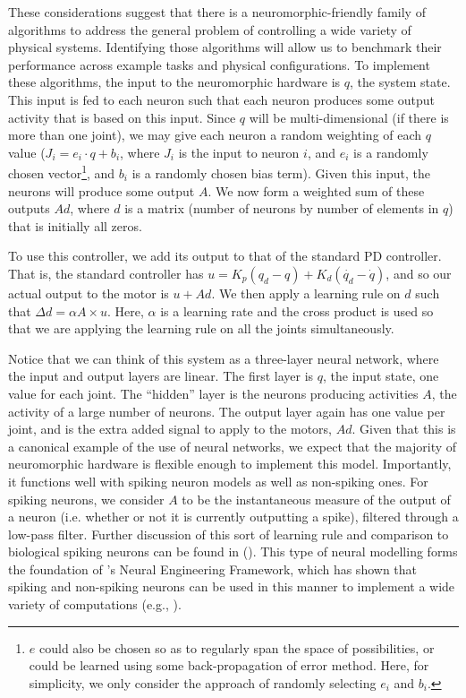 \documentclass{frontiersSCNS} %
\begin{document}
These considerations suggest that there is a neuromorphic-friendly family of 
algorithms to address the general problem of controlling a wide variety of 
physical systems.  Identifying those algorithms will allow us to benchmark 
their performance across example tasks and physical configurations.  
To implement these algorithms, the input to the
neuromorphic hardware is $q$, the system state.  This input is fed to each
neuron such that each neuron produces some output activity that is based on
this input.  Since $q$ will be multi-dimensional (if there is more than one
joint), we may give each neuron a random weighting of each $q$ value ($J_i=e_i \cdot q + b_i$, 
where $J_i$ is the input to neuron $i$, and $e_i$ is a randomly chosen 
vector\footnote{$e$ could also be chosen so as to regularly span the space of possibilities,
or could be learned using some back-propagation of error method.  Here, for simplicity, we only
consider the approach of randomly selecting $e_i$ and $b_i$.},
and $b_i$ is a randomly chosen bias term).  
Given this input, the neurons will produce some output $A$.
We now form a weighted sum of these outputs $Ad$, where $d$ is a matrix (number of neurons by number of elements in $q$)
that is initially all zeros.

To use this controller, we add its output to that of the standard PD controller.
That is, the standard controller has $u=K_p(q_d - q) + K_d(\dot{q_d} - \dot{q})$,
and so our actual output to the motor is $u + Ad$.  We then apply a learning
rule on $d$ such that $\Delta d = \alpha A \times u$.  Here, $\alpha$ is a learning
rate and the cross product is used so that we are applying the learning rule
on all the joints simultaneously.

Notice that we can think of this system as a three-layer neural
network, where the input and output layers are linear.  The first layer is $q$, the input state, one value for each joint.  The ``hidden'' layer
is the neurons producing activities $A$, the activity of a large number of neurons.  The output layer again has
one value per joint, and is the extra added signal to apply to the motors, $Ad$.
Given that this is a canonical example of the use of neural networks, we
expect that the majority of neuromorphic hardware is flexible enough to implement
this model.  Importantly, it functions well with spiking neuron models as 
well as non-spiking ones.  For spiking neurons, we consider $A$ to be the
instantaneous measure of the output of a neuron (i.e. whether or not it is currently outputting a spike),
filtered through a low-pass filter.  Further discussion of this sort of learning
rule and comparison to biological spiking neurons can be found in (\citealt{bekolay2013}).
This type of neural modelling forms the foundation of \cite{eliasmith2003}'s
Neural Engineering Framework, which has shown that spiking
and non-spiking neurons can be used in this manner to implement a wide
variety of computations (e.g., \citealt{stewart2014}).
\end{document}

